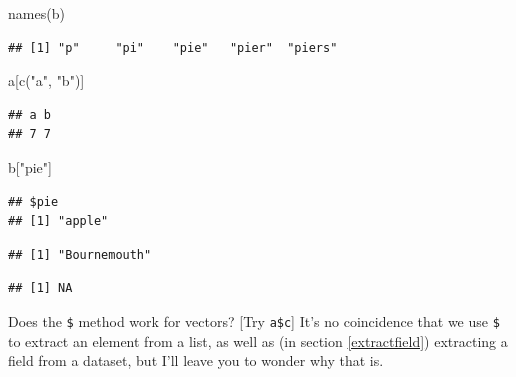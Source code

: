 \documentclass[
]{book}
\newenvironment{Shaded}{\begin{snugshade}}{\end{snugshade}}
\newcommand{\DecValTok}[1]{\textcolor[rgb]{0.00,0.00,0.81}{#1}}
\newcommand{\FunctionTok}[1]{\textcolor[rgb]{0.00,0.00,0.00}{#1}}
\newcommand{\NormalTok}[1]{#1}
\newcommand{\SpecialCharTok}[1]{\textcolor[rgb]{0.00,0.00,0.00}{#1}}
\newcommand{\StringTok}[1]{\textcolor[rgb]{0.31,0.60,0.02}{#1}}
\begin{document}
\begin{Shaded}
\begin{Highlighting}[]
\FunctionTok{names}\NormalTok{(b)}
\end{Highlighting}
\end{Shaded}

\begin{verbatim}
## [1] "p"     "pi"    "pie"   "pier"  "piers"
\end{verbatim}

\begin{Shaded}
\begin{Highlighting}[]
\NormalTok{a[}\FunctionTok{c}\NormalTok{(}\StringTok{"a"}\NormalTok{, }\StringTok{"b"}\NormalTok{)]}
\end{Highlighting}
\end{Shaded}

\begin{verbatim}
## a b 
## 7 7
\end{verbatim}

\begin{Shaded}
\begin{Highlighting}[]
\NormalTok{b[}\StringTok{"pie"}\NormalTok{]}
\end{Highlighting}
\end{Shaded}

\begin{verbatim}
## $pie
## [1] "apple"
\end{verbatim}

\begin{Shaded}
\end{Shaded}

\begin{verbatim}
## [1] "Bournemouth"
\end{verbatim}

\begin{Shaded}
\end{Shaded}

\begin{verbatim}
## [1] NA
\end{verbatim}

Does the \texttt{\$} method work for vectors? {[}Try \texttt{a\$c}{]} It's no coincidence that we use \texttt{\$} to extract an element from a list, as well as (in section \ref{extractfield}) extracting a field from a dataset, but I'll leave you to wonder why that is.
\end{document}

